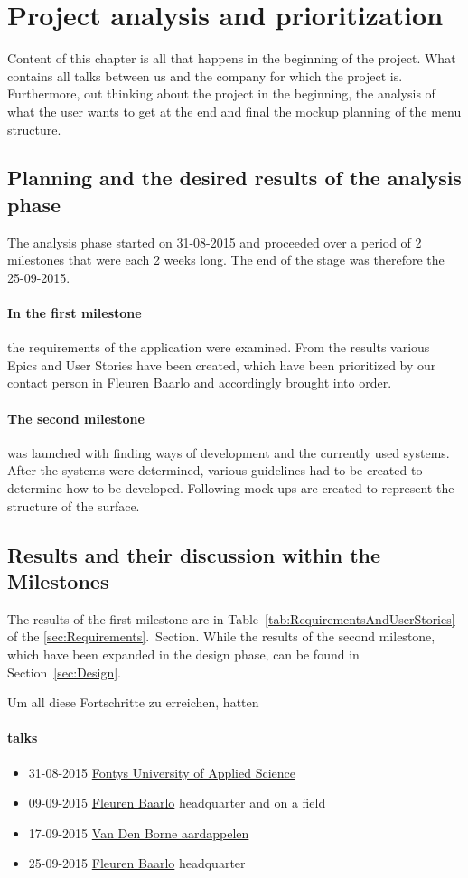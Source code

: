\section{Project analysis and prioritization}
\label{analysis}
Content of this chapter is all that happens in the beginning of the project. What contains all talks between us and the company for which the project is. Furthermore, out thinking about the project in the beginning, the analysis of what the user wants to get at the end and final the mockup planning of the menu structure.

\subsection{Planning and the desired results of the analysis phase}
The analysis phase started on 31-08-2015 and proceeded over a period of 2 milestones that were each 2 weeks long. The end of the stage was therefore the 25-09-2015.

\paragraph{In the first milestone} the requirements of the application were examined. From the results various Epics and User Stories have been created, which have been prioritized by our contact person in Fleuren Baarlo and accordingly brought into order.

\paragraph{The second milestone} was launched with finding ways of development and the currently used systems. After the systems were determined, various guidelines had to be created to determine how to be developed.
Following mock-ups are created to represent the structure of the surface.

\subsection{Results and their discussion within the Milestones}
The results of the first milestone are in Table~\ref{tab:RequirementsAndUserStories} of the \ref{sec:Requirements}.~Section. While the results of the second milestone, which have been expanded in the design phase, can be found in Section~\ref{sec:Design}.

Um all diese Fortschritte zu erreichen, hatten 
\paragraph{talks}
\begin{itemize}
	\item 31-08-2015 \href{http://fontys.nl}{Fontys University of Applied Science}
	\item 09-09-2015 \href{http://fleuren.net}{Fleuren Baarlo} headquarter and on a field
	\item 17-09-2015 \href{http://www.vandenborneaardappelen.com}{Van Den Borne aardappelen} 
	\item 25-09-2015 \href{http://fleuren.net}{Fleuren Baarlo} headquarter
\end{itemize}